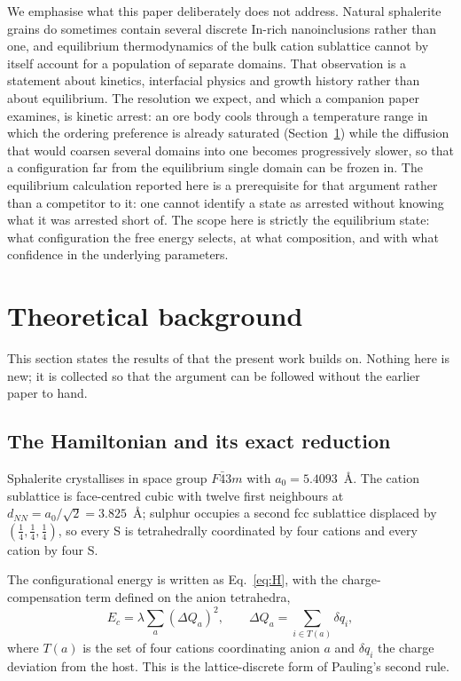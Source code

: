 \documentclass[11pt,a4paper]{article}
\newcommand{\dQ}{\Delta Q}
\begin{document}
We emphasise what this paper deliberately does not address. Natural sphalerite
grains do sometimes contain several discrete In-rich nanoinclusions rather than
one, and equilibrium thermodynamics of the bulk cation sublattice cannot by
itself account for a population of separate domains. That observation is a
statement about kinetics, interfacial physics and growth history rather than
about equilibrium. The resolution we expect, and which a companion paper
examines, is kinetic arrest: an ore body cools through a temperature range in
which the ordering preference is already saturated (Section~\ref{sec:background})
while the diffusion that would coarsen several domains into one becomes
progressively slower, so that a configuration far from the equilibrium single
domain can be frozen in. The equilibrium calculation reported here is a
prerequisite for that argument rather than a competitor to it: one cannot
identify a state as arrested without knowing what it was arrested short of. The scope here is
strictly the equilibrium state: what configuration the free energy selects, at
what composition, and with what confidence in the underlying parameters.

\section{Theoretical background}
\label{sec:background}

This section states the results of \citet{yu2026} that the present work builds
on. Nothing here is new; it is collected so that the argument can be followed
without the earlier paper to hand.

\subsection{The Hamiltonian and its exact reduction}

Sphalerite crystallises in space group $F\bar{4}3m$ with $a_0 = 5.4093$~\AA{}.
The cation sublattice is face-centred cubic with twelve first neighbours at
$d_{NN} = a_0/\sqrt{2} = 3.825$~\AA{}; sulphur occupies a second fcc sublattice
displaced by $(\tfrac14,\tfrac14,\tfrac14)$, so every S is tetrahedrally
coordinated by four cations and every cation by four S.

The configurational energy is written as Eq.~\eqref{eq:H}, with the
charge-compensation term defined on the anion tetrahedra,
\begin{equation}
E_c = \lambda \sum_{a} \left( \dQ_a \right)^2, \qquad
\dQ_a = \sum_{i \in T(a)} \delta q_i,
\label{eq:Ectet}
\end{equation}
where $T(a)$ is the set of four cations coordinating anion $a$ and $\delta q_i$
the charge deviation from the host. This is the lattice-discrete form of
Pauling's second rule.
\end{document}
